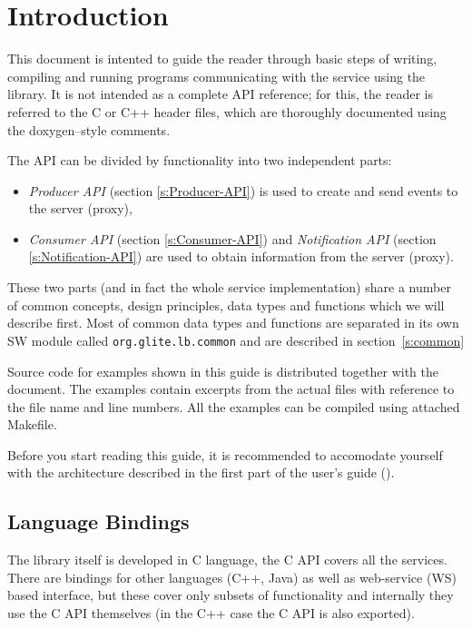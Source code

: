 
\section{Introduction}

This document is intented to guide the reader through basic steps
of writing, compiling and running programs communicating with the \LB
service using the \LB library. It is not intended as a complete API
reference; for this, the reader is referred to the C or C++ header
files, which are thoroughly documented using the doxygen--style
comments.

The \LB API can be divided by functionality into two independent
parts:
\begin{itemize}
\item \textit{\LB Producer API} (section \ref{s:Producer-API}) is used
to create and send events to the \LB server (proxy),
\item \textit{\LB Consumer API} (section \ref{s:Consumer-API}) and \textit{\LB
Notification API} (section \ref{s:Notification-API}) are used to obtain
information from the  \LB server (proxy).
\end{itemize}
These two parts (and in fact the whole \LB service implementation)
share a number of common concepts, design principles, data types and
functions which we will describe first. Most of common data types and
functions are separated in its own SW module called
\verb'org.glite.lb.common' and are described in section~\ref{s:common}

%
Source code for examples shown in this guide is distributed together
with the document. The examples contain excerpts from the actual files
with reference to the file name and line numbers. All the examples can
be compiled using attached Makefile.

%
Before you start reading this guide, it is recommended to accomodate
yourself with the \LB architecture described in the first part of the
\LB user's guide (\cite{lbug}).


\subsection{Language Bindings}
The \LB library itself is developed in C language, the C API covers
all the \LB services. There are bindings for other languages (C++,
Java) as well as web-service (WS) based interface, but these cover only
subsets of \LB functionality and internally they use the C API
themselves (in the C++ case the C API is also exported).

